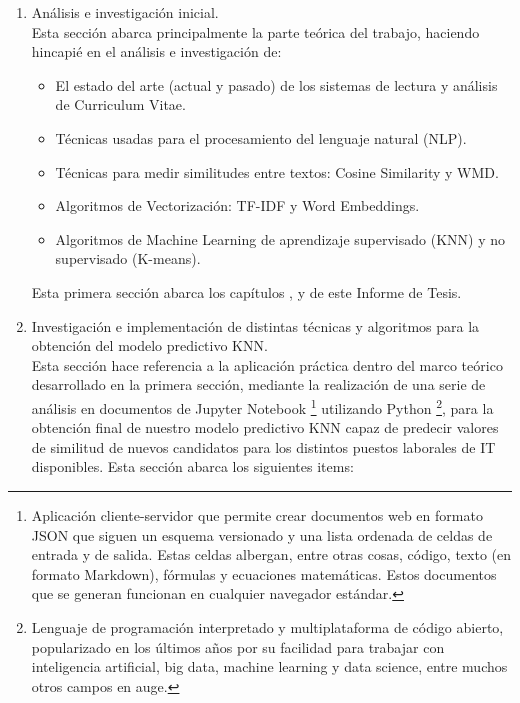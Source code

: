 \documentclass[12pt,a4paper]{article}
\begin{document}
\begin{enumerate}
\item Análisis e investigación inicial. \\

Esta sección abarca principalmente la parte teórica del trabajo, haciendo hincapié en el análisis e investigación de:
\begin{itemize}
	\item El estado del arte (actual y pasado) de los sistemas de lectura y análisis de Curriculum Vitae.
	\item Técnicas usadas para el procesamiento del lenguaje natural (NLP).
	\item Técnicas para medir similitudes entre textos: Cosine Similarity y WMD.
	\item Algoritmos de Vectorización: TF-IDF y Word Embeddings.
	\item Algoritmos de Machine Learning de aprendizaje supervisado (KNN) y no supervisado (K-means).
\end{itemize} 

Esta primera sección abarca los capítulos \textit{}, \textit{} y \textit{} de este Informe de Tesis. \\

\item Investigación e implementación de distintas técnicas y algoritmos para la obtención del modelo predictivo KNN. \\

Esta sección hace referencia a la aplicación práctica dentro del marco teórico desarrollado en la primera sección, mediante la realización de una serie de análisis en documentos de Jupyter Notebook \footnote{Aplicación cliente-servidor que permite crear documentos web en formato JSON que siguen un esquema versionado y una lista ordenada de celdas de entrada y de salida. Estas celdas albergan, entre otras cosas, código, texto (en formato Markdown), fórmulas y ecuaciones matemáticas. Estos documentos que se generan funcionan en cualquier navegador estándar.} utilizando Python \footnote{Lenguaje de programación interpretado y multiplataforma de código abierto, popularizado en los últimos años por su facilidad para trabajar con inteligencia artificial, big data, machine learning y data science, entre muchos otros campos en auge.}, para la obtención final de nuestro modelo predictivo KNN capaz de predecir valores de similitud de nuevos candidatos para los distintos puestos laborales de IT disponibles.  Esta sección abarca los siguientes items:


\end{enumerate}
\end{document}
